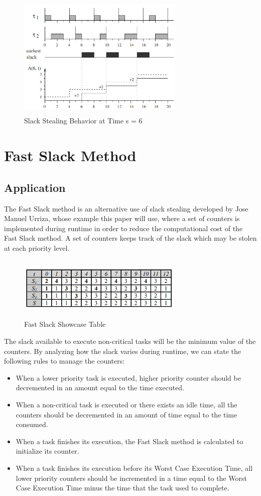 \documentclass[conference]{IEEEtran}
\begin{document}
\begin{figure}[h!]
	\includegraphics[width=8cm, height=6cm]{behavior3}
	\caption{Slack Stealing Behavior at Time s = 6}
	\centering
\end{figure}

\section {Fast Slack Method}
\subsection{Application}
The Fast Slack method is an alternative use of slack stealing developed by Jose Manuel Urriza, whose example this paper will use, where a set of counters is implemented during runtime in order to reduce the computational cost of the Fast Slack method. 
A set of counters keeps track of the slack which may be stolen at each priority level. 
\begin{figure}[h!]
	\includegraphics[width=8cm, height=3cm]{table2}
	\caption{Fast Slack Showcase Table}
	\centering
\end{figure}
The slack available to
execute non-critical tasks will be the minimum value of the counters. By analyzing how the slack varies during
runtime, we can state the following rules to manage the counters:

\begin{itemize}
	\item When a lower priority task is executed, higher priority counter should be decremented in an amount equal to the time executed.
	\item When a non-critical task is executed or there exists an idle time, all the counters should be decremented in an amount of time equal to the time consumed.
	\item When a task finishes its execution, the Fast Slack method is calculated to initialize its counter. 
	\item When a task finishes its execution before its Worst Case Execution Time, all lower priority counters
	should be incremented in a time equal to the Worst Case Execution Time minus the time that the task used
	to complete.
\end{itemize}
\end{document}
